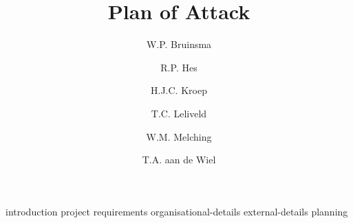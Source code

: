 \documentclass[a4paper, openany, oneside]{memoir}
\title{Plan of Attack}
\author{W.P. Bruinsma \and R.P. Hes \and H.J.C. Kroep \and T.C. Leliveld \and W.M. Melching \and T.A. aan de Wiel}
\begin{document}
\frontmatter

\begin{titlingpage}
  \pagestyle{empty}
  \maketitle
\end{titlingpage}


\tableofcontents

\mainmatter
{introduction}
{project}
{requirements}
{organisational-details}
{external-details}
{planning}

\printbibliography

\appendix
\end{document}
